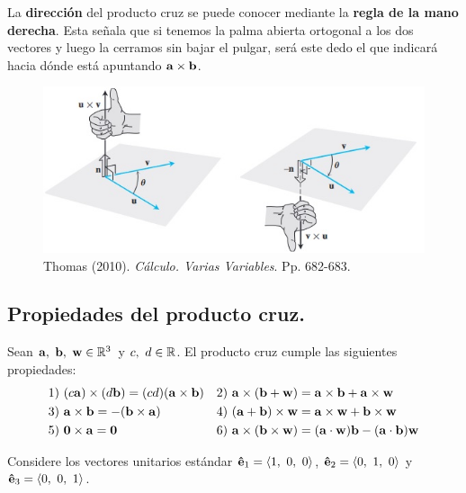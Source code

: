 \documentclass[12pt]{article}
\begin{document}
La \textbf{dirección} del producto cruz se puede conocer mediante la \textbf{regla de la mano derecha}. Esta señala que si tenemos la palma abierta ortogonal a los dos vectores y luego la cerramos sin bajar el pulgar, será este dedo el que indicará hacia dónde está apuntando $\mathbf{a} \times \mathbf{b}$.

\begin{figure}[hbt!]
\centering
\includegraphics[scale=0.73]{regla-mano-derecha.jpg}
\caption{Thomas (2010). \textit{Cálculo. Varias Variables}. Pp. 682-683.}
\end{figure}

\subsection{Propiedades del producto cruz.}

Sean $\vecmat{a}, \ \vecmat{b}, \ \vecmat{w} \in \R^{3}$ y $c, \ d \in \mathbb{R}$. El producto cruz cumple las siguientes propiedades:
\begin{align*}
&1) \ (c\mathbf{a}) \times (d\mathbf{b}) = (cd) (\mathbf{a} \times \mathbf{b}) &
&2) \ \mathbf{a} \times (\mathbf{b} + \mathbf{w}) = \mathbf{a} \times \mathbf{b} + \mathbf{a} \times \mathbf{w} \\
&3) \ \mathbf{a} \times \mathbf{b} = -(\mathbf{b} \times \mathbf{a}) &
&4) \ (\mathbf{a} + \mathbf{b}) \times \mathbf{w} = \mathbf{a} \times \mathbf{w} + \mathbf{b} \times \mathbf{w} \\
&5) \ \mathbf{0} \times \mathbf{a} = \mathbf{0} &
&6) \ \mathbf{a} \times (\mathbf{b} \times \mathbf{w}) = (\mathbf{a} \cdot \mathbf{w})\mathbf{b} - (\mathbf{a} \cdot \mathbf{b}) \mathbf{w}
\end{align*}

Considere los vectores unitarios estándar $\mathbf{\hat{e}}_{1} = \langle 1, \ 0, \ 0 \rangle$, $\mathbf{\hat{e}}_{2} = \langle 0, \ 1, \ 0 \rangle$ y $\mathbf{\hat{e}}_{3} = \langle 0, \ 0, \ 1 \rangle$.
\end{document}
